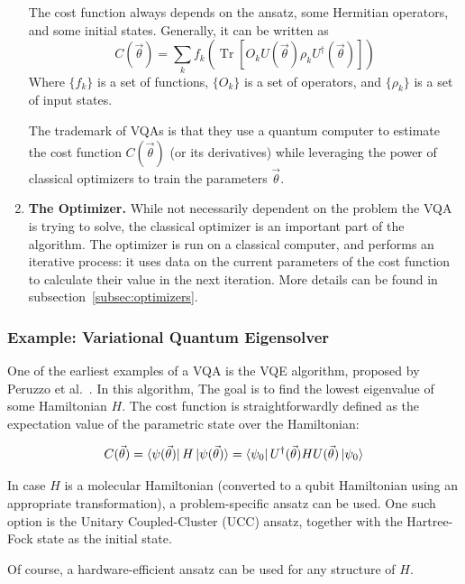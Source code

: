 \documentclass[a4paper,12pt]{article}
\newcommand{\thetas}{\vec{\theta}}
\DeclareMathOperator{\tr}{Tr}
\begin{document}
\begin{enumerate}
    The cost function always depends on the ansatz, some Hermitian operators, and some initial states.
    Generally, it can be written as
    \begin{equation} \label{eqn:general_cost}
        C(\thetas) = \sum_k f_k(\tr[O_k U(\thetas) \rho_k U^\dagger(\thetas)])
    \end{equation} 
    Where $\{f_k\}$ is a set of functions, $\{O_k\}$ is a set of operators, and $\{\rho_k\}$ is a set of input states.
    
    The trademark of VQAs is that they use a quantum computer to estimate the cost function $C(\thetas)$ (or its derivatives) while leveraging the power of classical optimizers to train the parameters $\thetas$.
    
    \item \textbf{The Optimizer.} While not necessarily dependent on the problem the VQA is trying to solve, the classical optimizer is an important part of the algorithm.
    The optimizer is run on a classical computer, and performs an iterative process: it uses data on the current parameters of the cost function to calculate their value in the next iteration. More details can be found in subsection~\ref{subsec:optimizers}.
\end{enumerate}


\subsubsection{Example: Variational Quantum Eigensolver}
One of the earliest examples of a VQA is the VQE algorithm, proposed by Peruzzo et al.~\cite{peruzzo_variational_2014}. In this algorithm, The goal is to find the lowest eigenvalue of some Hamiltonian $H$.
The cost function is straightforwardly defined as the expectation value of the parametric state over the Hamiltonian:

\begin{equation} \label{eqn:vqe_cost}
    C(\thetas) = \bra{\psi(\thetas)} H \ket{\psi(\thetas)} = \bra{\psi_0} U^\dagger(\thetas) H U(\thetas) \ket{\psi_0}
\end{equation}

In case $H$ is a molecular Hamiltonian (converted to a qubit Hamiltonian using an appropriate transformation), a problem-specific ansatz can be used. One such option is the Unitary Coupled-Cluster (UCC) ansatz, together with the Hartree-Fock state as the initial state.

Of course, a hardware-efficient ansatz can be used for any structure of $H$.
\end{document}
